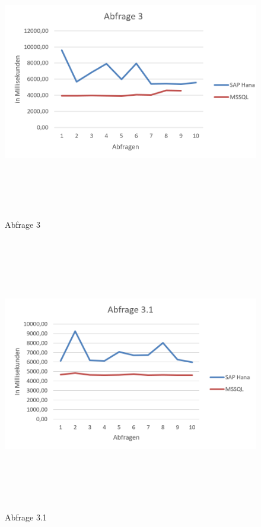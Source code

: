 \documentclass[a4paper, 12pt]{scrartcl}
\begin{document}
\begin{figure}[H]
\centering
\includegraphics[height=12cm, width=15cm, keepaspectratio]{diag1.png}
\caption{Abfrage 3}
\end{figure}  

\begin{figure}[H]
\centering
\includegraphics[height=12cm, width=15cm, keepaspectratio]{diag2.png}
\caption{Abfrage 3.1}
\end{figure}  
\end{document}
